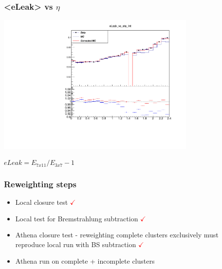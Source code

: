 \documentclass{beamer}
\begin{document}
\begin{frame}
\frametitle{<eLeak> vs $\eta$}

\includegraphics[height=7cm]{eLeak_vs_eta_Int.pdf}
\centering

$eLeak = E_{7x11}/E_{3x7} - 1$
\end{frame}
\begin{frame}
\frametitle{Reweighting steps}
\begin{itemize}
\item Local closure test \textcolor{red}{ $\checkmark$}\\
\item Local test for Bremstrahlung subtraction \textcolor{red}{ $\checkmark$}\\
\item Athena closure test - reweighting complete clusters exclusively must reproduce local run with BS subtraction \textcolor{red}{ $\checkmark$}\\
\item Athena run on complete + incomplete clusters\\
\end{itemize}
\end{frame}
\end{document}
